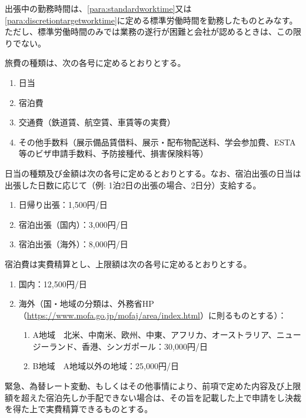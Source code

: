 \documentclass[10pt,a4paper,uplatex]{jsarticle}
\begin{document}
出張中の勤務時間は、\ref{para:standardworktime}又は\ref{para:discretiontargetworktime}に定める標準労働時間を勤務したものとみなす。ただし、標準労働時間のみでは業務の遂行が困難と会社が認めるときは、この限りでない。

旅費の種類は、次の各号に定めるとおりとする。
\begin{enumerate}
    \item 日当
    \item 宿泊費
    \item 交通費（鉄道賃、航空賃、車賃等の実費）
    \item その他手数料（展示備品賃借料、展示・配布物配送料、学会参加費、ESTA等のビザ申請手数料、予防接種代、損害保険料等）
\end{enumerate}

日当の種類及び金額は次の各号に定めるとおりとする。なお、宿泊出張の日当は出張した日数に応じて（例: 1泊2日の出張の場合、2日分）支給する。
\begin{enumerate}
    \item 日帰り出張：1,500円/日
    \item 宿泊出張（国内）：3,000円/日
    \item 宿泊出張（海外）：8,000円/日
\end{enumerate}

宿泊費は実費精算とし、上限額は次の各号に定めるとおりとする。
\begin{enumerate}
    \item 国内：12,500円/日
    \item 海外（国・地域の分類は、外務省HP（\url{https://www.mofa.go.jp/mofaj/area/index.html}）に則るものとする）：
    \begin{enumerate}
        \item A地域　北米、中南米、欧州、中東、アフリカ、オーストラリア、ニュージーランド、香港、シンガポール：30,000円/日
        \item B地域　A地域以外の地域：25,000円/日
    \end{enumerate}
\end{enumerate}
\term 緊急、為替レート変動、もしくはその他事情により、前項で定めた内容及び上限額を超えた宿泊先しか手配できない場合は、その旨を記載した上で申請をし決裁を得た上で実費精算できるものとする。
\end{document}
